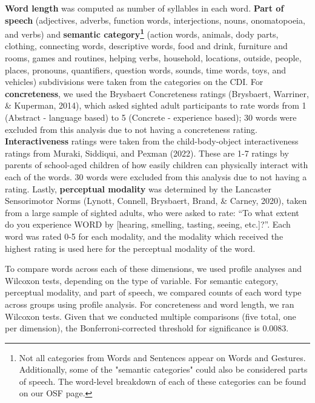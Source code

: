 \documentclass[english,man,floatsintext]{apa6}
\begin{document}
\textbf{Word length} was computed as number of syllables in each word. \textbf{Part of speech} (adjectives, adverbs, function words, interjections, nouns, onomatopoeia, and verbs) and \textbf{semantic category\footnote{Not all categories from Words and Sentences appear on Words and Gestures. Additionally, some of the "semantic categories" could also be considered parts of speech. The word-level breakdown of each of these categories can be found on our OSF page.}} (action words, animals, dody parts, clothing, connecting words, descriptive words, food and drink, furniture and rooms, games and routines, helping verbs, household, locations, outside, people, places, pronouns, quantifiers, question words, sounds, time words, toys, and vehicles) subdivisions were taken from the categories on the CDI. For \textbf{concreteness}, we used the Brysbaert Concreteness ratings (Brysbaert, Warriner, \& Kuperman, 2014), which asked sighted adult participants to rate words from 1 (Abstract - language based) to 5 (Concrete - experience based); 30 words were excluded from this analysis due to not having a concreteness rating. \textbf{Interactiveness} ratings were taken from the child-body-object interactiveness ratings from Muraki, Siddiqui, and Pexman (2022). These are 1-7 ratings by parents of school-aged children of how easily children can physically interact with each of the words. 30 words were excluded from this analysis due to not having a rating. Lastly, \textbf{perceptual modality} was determined by the Lancaster Sensorimotor Norms (Lynott, Connell, Brysbaert, Brand, \& Carney, 2020), taken from a large sample of sighted adults, who were asked to rate: \enquote{To what extent do you experience WORD by {[}hearing, smelling, tasting, seeing, etc.{]}?}. Each word was rated 0-5 for each modality, and the modality which received the highest rating is used here for the perceptual modality of the word.

To compare words across each of these dimensions, we used profile analyses and Wilcoxon tests, depending on the type of variable. For semantic category, perceptual modality, and part of speech, we compared counts of each word type across groups using profile analysis. For concreteness and word length, we ran Wilcoxon tests. Given that we conducted multiple comparisons (five total, one per dimension), the Bonferroni-corrected threshold for significance is 0.0083.
\end{document}
